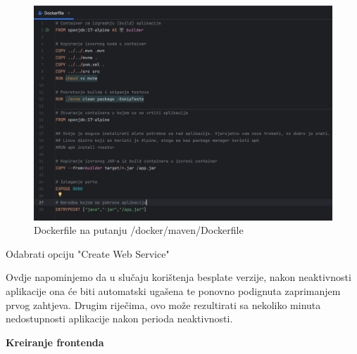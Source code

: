 \begin{packed_enum}
				\begin{figure}[H]
					\includegraphics[scale=0.45]{deploy/dockerFile.png}
					\centering
					\caption{Dockerfile na putanju /docker/maven/Dockerfile}
					\label{fig:promjene}
				\end{figure}
				
				\item 	Odabrati opciju "Create Web Service"
				
				Ovdje napominjemo da u slučaju korištenja besplate verzije, nakon neaktivnosti aplikacije ona će biti automatski ugašena te ponovno podignuta zaprimanjem prvog zahtjeva. Drugim riječima, ovo može rezultirati sa nekoliko minuta nedostupnosti aplikacije nakon perioda neaktivnosti.
				
			\end{packed_enum}


			\textbf{Kreiranje frontenda}
			
